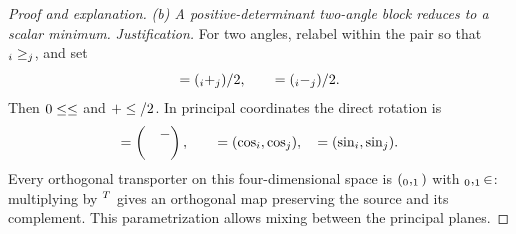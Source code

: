 \begin{proof}[Proof and explanation]
\emph{(b) A positive-determinant two-angle block reduces to a scalar minimum.}
\emph{Justification.} For two angles, relabel within the pair so that
$\like{theta}{\symglyph{theta}_i}\ge\like{theta}{\symglyph{theta}_j}$, and set
\[
 \sym{PairMeanAngle}=(\like{theta}{\symglyph{theta}_i}+\like{theta}{\symglyph{theta}_j})/2,\qquad
 \sym{PairHalfDifference}=(\like{theta}{\symglyph{theta}_i}-\like{theta}{\symglyph{theta}_j})/2.
\]
Then $0\le \sym{PairHalfDifference}\le \sym{PairMeanAngle}$ and $\sym{PairMeanAngle}+\sym{PairHalfDifference}\le\sym{PiConstant}/2$.
In principal coordinates the direct rotation is
\[
 \sym{PairDirectRotation}=\begin{pmatrix}\sym{PairCosineBlock}&-\sym{PairSineBlock}\\\sym{PairSineBlock}&\sym{PairCosineBlock}\end{pmatrix},\qquad
 \sym{PairCosineBlock}=\sym{DiagonalOperator}(\cos\like{theta}{\symglyph{theta}_i},
                      \cos\like{theta}{\symglyph{theta}_j}),\quad
 \sym{PairSineBlock}=\sym{DiagonalOperator}(\sin\like{theta}{\symglyph{theta}_i},
                      \sin\like{theta}{\symglyph{theta}_j}).
\]
Every orthogonal transporter on this four-dimensional space is
$\sym{PairDirectRotation}\sym{DiagonalOperator}(\like{PairFreeOrthogonal}{\symglyph{PairFreeOrthogonal}_0},\like{PairFreeOrthogonal}{\symglyph{PairFreeOrthogonal}_1})$ with $\like{PairFreeOrthogonal}{\symglyph{PairFreeOrthogonal}_0},\like{PairFreeOrthogonal}{\symglyph{PairFreeOrthogonal}_1}\in \sym{PlanarOrthogonalGroup}$:
multiplying by $\sym{PairDirectRotation}^T$ gives an orthogonal map preserving the source
and its complement. This parametrization allows mixing between the
principal planes.


\end{proof}
